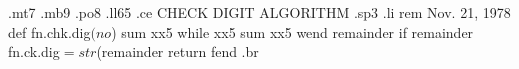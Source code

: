 .mt7
.mb9
.po8
.ll65
.ce
CHECK DIGIT ALGORITHM
.sp3
.li
rem	   Nov. 21, 1978
def fn.chk.dig$(no$)
	 sum%
	 xx5%
	 while xx5%
		 sum%
		 xx5%
	 wend
	 remainder%
	 if remainder%
	 fn.ck.dig$=str$(remainder%
	 return
fend
.br
